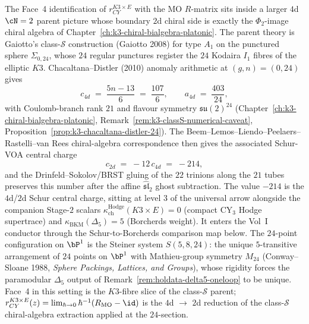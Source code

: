 \begin{remark}[Class-\texorpdfstring{$\mathcal{S}$}{S} \texorpdfstring{$A_1$}{A-1} on \texorpdfstring{$\Sigma_{0,24}$}{Sigma-0,24} is the \texorpdfstring{$4$}{4}d \texorpdfstring{$\cN=2$}{cN=2} parent of \texorpdfstring{$\Delta_5$}{Delta-5}]
\label{rem:holdata-class-s-parent}
The Face~4 identification of $r_{CY}^{K3 \times E}$ with the MO $R$-matrix
sits inside a larger $4$d $\cN=2$ parent picture whose boundary
$2$d chiral side is exactly the $\Phi_2$-image chiral algebra of
Chapter~\ref{ch:k3-chiral-bialgebra-platonic}. The parent theory is
Gaiotto's class-$\mathcal{S}$ construction (Gaiotto 2008) for type
$A_1$ on the punctured sphere $\Sigma_{0,24}$, whose $24$ regular
punctures register the $24$ Kodaira $I_1$ fibres of the elliptic $K3$.
Chacaltana--Distler (2010) anomaly arithmetic at $(g, n) = (0, 24)$
gives
\[
 c_{4d} \;=\; \frac{5 n - 13}{6}
 \;=\; \frac{107}{6}, \qquad
 a_{4d} \;=\; \frac{403}{24},
\]
with Coulomb-branch rank $21$ and flavour symmetry
$\mathfrak{su}(2)^{24}$ (Chapter~\ref{ch:k3-chiral-bialgebra-platonic},
Remark~\ref{rem:k3-classS-numerical-caveat},
Proposition~\ref{prop:k3-chacaltana-distler-24}).
The Beem--Lemos--Liendo--Peelaers--Rastelli--van Rees
chiral-algebra correspondence then gives the associated Schur-VOA
central charge
\[
 c_{2d} \;=\; -12\, c_{4d} \;=\; -214,
\]
and the Drinfeld--Sokolov/BRST gluing of the $22$ trinions along the
$21$ tubes preserves this number after the affine
$\widehat{\mathfrak{sl}}_2$ ghost subtraction. The value $-214$ is the
$4$d/$2$d Schur central charge, sitting at level $3$ of the universal
arrow alongside the companion Stage-$2$ scalars
$\kappa_{\mathrm{ch}}^{\mathrm{Hodge}}(K3 \times E) = 0$ (compact CY$_3$ Hodge supertrace)
and $\kappa_{\mathrm{BKM}}(\Delta_5) = 5$ (Borcherds weight). It enters
the Vol~I conductor through the Schur-to-Borcherds comparison map
below. The $24$-point configuration on $\bP^1$ is the Steiner system
$S(5, 8, 24)$: the unique $5$-transitive arrangement of $24$ points on
$\bP^1$ with Mathieu-group symmetry $M_{24}$ (Conway--Sloane 1988,
\emph{Sphere Packings, Lattices, and Groups}), whose rigidity forces
the paramodular $\Delta_5$ output of
Remark~\ref{rem:holdata-delta5-oneloop} to be unique. Face~4 in
this setting is the $K3$-fibre slice of the class-$\mathcal{S}$ parent;
$r_{CY}^{K3 \times E}(z) = \lim_{\hbar \to 0} \hbar^{-1}(R_{\mathrm{MO}} -
\id)$ is the $4$d $\to$ $2$d reduction of the class-$\mathcal{S}$
chiral-algebra extraction applied at the $24$-section.
\end{remark}

